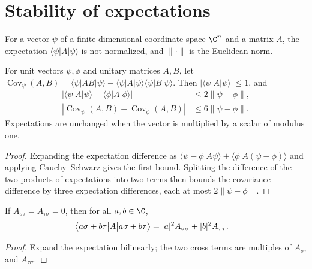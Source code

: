 \section{Stability of expectations}
\label{sec:siteconfig_expectations}

For a vector $\psi$ of a finite-dimensional coordinate space $\C^n$ and a matrix
$A$, the expectation $\langle\psi|A|\psi\rangle$ is not normalized, and
$\|\cdot\|$ is the Euclidean norm.

\begin{lemma}
    \label{thm:ldp_covariance_stability}
    \leanok
    For unit vectors $\psi,\phi$ and unitary matrices $A,B$, let
    $\operatorname{Cov}_\psi(A,B)=
        \langle\psi|AB|\psi\rangle-
        \langle\psi|A|\psi\rangle\langle\psi|B|\psi\rangle$.
    Then $|\langle\psi|A|\psi\rangle|\le1$, and
    \begin{align}
        |\langle\psi|A|\psi\rangle-
        \langle\phi|A|\phi\rangle| & \le2\|\psi-\phi\|, \\
        |\operatorname{Cov}_\psi(A,B)-\operatorname{Cov}_\phi(A,B)|
                                   & \le6\|\psi-\phi\|.
    \end{align}
    Expectations are unchanged when the vector is multiplied by a scalar of
    modulus one.
\end{lemma}
\begin{proof}
    \leanok
    Expanding the expectation difference as
    $\langle\psi-\phi|A\psi\rangle+
        \langle\phi|A(\psi-\phi)\rangle$ and applying Cauchy--Schwarz
    gives the first bound. Splitting the difference of the two products
    of expectations into two terms then bounds the covariance difference
    by three expectation differences, each at most $2\|\psi-\phi\|$.
\end{proof}

\begin{lemma}
    \label{lem:siteconfig_two_basis_superposition}
    \leanok
    If $A_{\sigma\tau}=A_{\tau\sigma}=0$, then for all $a,b\in\C$,
    \begin{align}
        \bigl\langle a\sigma+b\tau\big|A\big|a\sigma+b\tau\bigr\rangle
         & =|a|^2A_{\sigma\sigma}+|b|^2A_{\tau\tau}.\notag
    \end{align}
\end{lemma}
\begin{proof}
    \leanok
    Expand the expectation bilinearly; the two cross terms are multiples of
    $A_{\sigma\tau}$ and $A_{\tau\sigma}$.
\end{proof}
